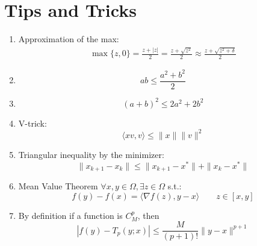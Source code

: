 \documentclass[12pt, openany]{report}
\theoremstyle{definition}
\begin{document}
\chapter{Tips and Tricks}\label{chap:tricks}
\begin{enumerate}
	\item Approximation of the max:
	\begin{equation}\label{eq:approx_max}
		\begin{aligned}
			\max\{z,0\} = \frac{z+|z|}{2} = \frac{z + \sqrt{z^2}}{2} \approx \frac{z + \sqrt{z^2 + \delta}}{2}
		\end{aligned}	
	\end{equation}
	\item \begin{equation}\label{eq:sq1}
		ab \leq \frac{a^2+b^2}{2}	
	\end{equation}
	\item \begin{equation}\label{eq:sq2}
		(a+b)^2 \leq 2a^2+2b^2
	\end{equation}
	\item V-trick:
	\begin{equation}\label{eq:vtrick}
		\langle xv,v\rangle \leq \|x\|\|v\|^2
	\end{equation}
	\item Triangular inequality by the minimizer: 
	\begin{equation}\label{eq:triangular_inequality_by_min}
		\|x_{k+1}-x_k\| \leq \|x_{k+1}-x^*\|+\|x_k-x^*\|
	\end{equation}
	\item Mean Value Theorem $\forall x,y \in \Omega, \exists z \in \Omega$ s.t.:
	\begin{equation}
		f(y)-f(x) = \langle \nabla f(z),y-x\rangle \qquad z \in [x,y]
	\end{equation}
	\item By definition if a function is $C^p_M$, then 
	\begin{equation}
		|f(y) - T_p(y;x)| \leq \frac{M}{(p+1)!}\|y-x\|^{p+1}
	\end{equation}
\end{enumerate}
\end{document}
